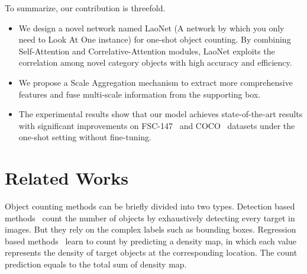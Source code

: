 \documentclass{article}
\begin{document}
To summarize, our contribution is threefold. %

\begin{itemize}
    \item We design a novel network named LaoNet (A network by which you only need to Look At One instance) for one-shot object counting. By combining Self-Attention and Correlative-Attention modules,  LaoNet exploits the correlation among novel category objects with high accuracy and efficiency.
    
	\item We propose a Scale Aggregation mechanism to extract more comprehensive features and fuse multi-scale information from the supporting box.
	
	\item The experimental results show that our model achieves state-of-the-art results with significant improvements on FSC-147~\cite{ranjan2021learning} and COCO~\cite{lin2014microsoft} datasets under the one-shot setting without fine-tuning.
	
	
\end{itemize}


\section{Related Works}

Object counting methods can be briefly divided into two types. Detection based methods~\cite{chattopadhyay2017counting} count the number of objects by exhaustively detecting every target in images. But they rely on the complex labels such as bounding boxes. Regression based methods~\cite{zhang2016single, ma2019bayesian} learn to count by predicting a density map, in which each value represents the density of target objects at the corresponding location. The count prediction equals to the total sum of density map.
\end{document}

